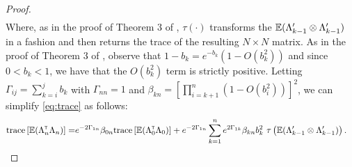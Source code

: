 \begin{proof}
\begin{align}
 \end{align}
Where, as in the proof of Theorem 3 of \cite{spall-jacobian}, $\tau(\cdot)$ transforms the $\mathbb{E} (\Lambda_{k-1}' \otimes \Lambda_{k-1}')$ in a  fashion and then returns the trace of the resulting $N\times N$ matrix.
As in the proof of Theorem 3 of \cite{spall-jacobian}, observe that $1-b_k = e^{-b_k}(1-O(b_k^2))$ and since $0 < b_k <1$, we have that the $O(b_k^2)$ term is strictly positive. 
Letting $\Gamma_{ij} = \sum_{k=i}^j b_k$ with $\Gamma_{nn} = 1$ and $\beta_{kn} = \left[\prod_{i=k+1}^n (1- O(b_i^2))\right]^2$, we can simplify \eqref{eq:trace} as follows:
\begin{align}\label{eq:wij}
 \text{trace} \left[\mathbb{E} (\Lambda_n ^\mathsf{\scriptscriptstyle T} \Lambda_n)\right] = &e^{-2 \Gamma_{1n}} \beta_{0n} \text{trace} \left[\mathbb{E} (\Lambda_0 ^\mathsf{\scriptscriptstyle T} \Lambda_0)\right]  + e^{-2 \Gamma_{1n}} \sum_{k=1}^n e^{2 \Gamma_{1k}} \beta_{kn} b_k^2  \,\,\tau\left(\mathbb{E} (\Lambda_{k-1}' \otimes \Lambda_{k-1}')\right).
 \end{align} 

\end{proof}
